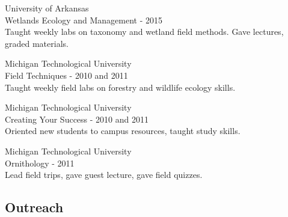 \documentclass[]{article}
\begin{document}
University of Arkansas\\
Wetlands Ecology and Management - 2015\\
Taught weekly labs on taxonomy and wetland field methods. Gave lectures,
graded materials.

Michigan Technological University\\
Field Techniques - 2010 and 2011\\
Taught weekly field labs on forestry and wildlife ecology skills.

Michigan Technological University\\
Creating Your Success - 2010 and 2011\\
Oriented new students to campus resources, taught study skills.

Michigan Technological University\\
Ornithology - 2011\\
Lead field trips, gave guest lecture, gave field quizzes.

\subsection{Outreach}\label{outreach}
\end{document}
